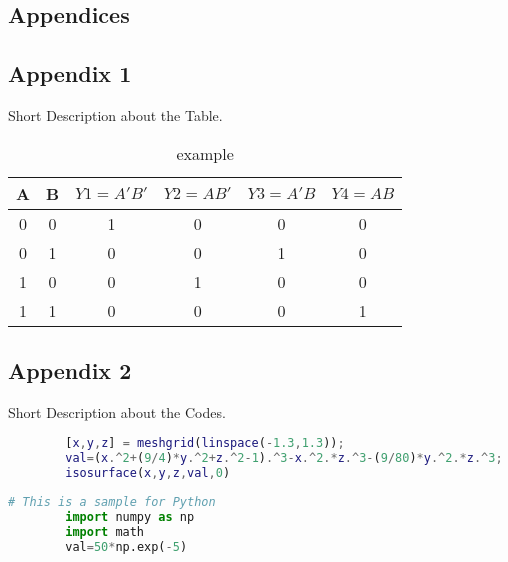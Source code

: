 \documentclass[12pt]{article}
\begin{document}
\newpage
\begin{appendices}
    \section*{\textbf{Appendices}}


    \subsection*{Appendix 1}

    Short Description about the Table.

    \begin{table}[h!]
        \caption{example}
        \centering
        \begin{tabular}{|c|c|c|c|c|c|}
        \hline
        A & B & $Y1=A'B'$ & $Y2=AB'$ & $Y3=A'B$ & $Y4=AB$ \\ \hline
        0 & 0 & 1  & 0  & 0  & 0  \\ \hline
        0 & 1 & 0  & 0  & 1  & 0  \\ \hline
        1 & 0 & 0  & 1  & 0  & 0  \\ \hline
        1 & 1 & 0  & 0  & 0  & 1  \\ \hline
        \end{tabular}
    \end{table}

    \subsection*{Appendix 2}

    Short Description about the Codes.

    \begin{lstlisting}[language=Matlab, caption=matlab example]
        % This is a sample for Matlab
        [x,y,z] = meshgrid(linspace(-1.3,1.3));
        val=(x.^2+(9/4)*y.^2+z.^2-1).^3-x.^2.*z.^3-(9/80)*y.^2.*z.^3;
        isosurface(x,y,z,val,0)
    \end{lstlisting}

    \begin{lstlisting}[language=Python, caption=Python example]
        # This is a sample for Python
        import numpy as np
        import math
        val=50*np.exp(-5)
    \end{lstlisting}
     
\end{appendices}
\end{document}
